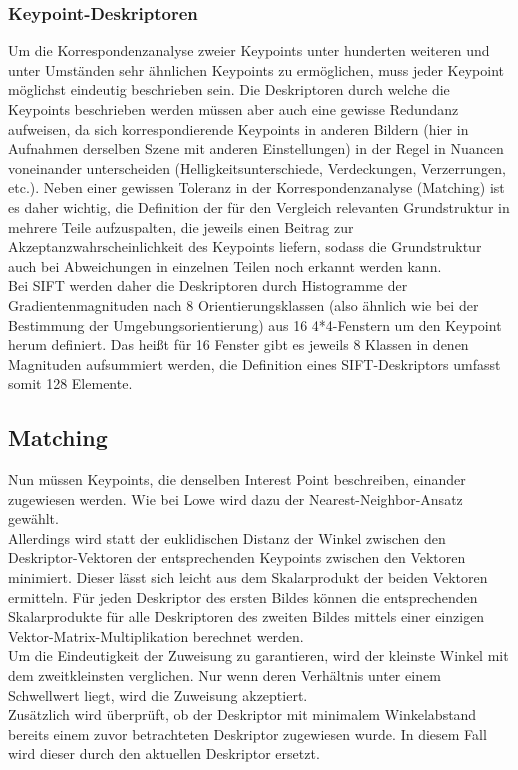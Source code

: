 \documentclass[deutsch]{scrartcl}
\begin{document}
\subsubsection{Keypoint-Deskriptoren}
Um die Korrespondenzanalyse zweier Keypoints unter hunderten weiteren und unter Umständen sehr ähnlichen Keypoints zu ermöglichen, muss jeder Keypoint möglichst eindeutig beschrieben sein. Die Deskriptoren durch welche die Keypoints beschrieben werden müssen aber auch eine gewisse Redundanz aufweisen, da sich korrespondierende Keypoints in anderen Bildern (hier in Aufnahmen derselben Szene mit anderen Einstellungen) in der Regel in Nuancen voneinander unterscheiden (Helligkeitsunterschiede, Verdeckungen, Verzerrungen, etc.). Neben einer gewissen Toleranz in der Korrespondenzanalyse (Matching) ist es daher wichtig, die Definition der für den Vergleich relevanten Grundstruktur in mehrere Teile aufzuspalten, die jeweils einen Beitrag zur Akzeptanzwahrscheinlichkeit des Keypoints liefern, sodass die Grundstruktur auch bei Abweichungen in einzelnen Teilen noch erkannt werden kann.\\
Bei SIFT werden daher die Deskriptoren durch Histogramme der Gradientenmagnituden nach 8 Orientierungsklassen (also ähnlich wie bei der Bestimmung der Umgebungsorientierung) aus 16 4*4-Fenstern um den Keypoint herum definiert. Das heißt für 16 Fenster gibt es jeweils 8 Klassen in denen Magnituden aufsummiert werden, die Definition eines SIFT-Deskriptors umfasst somit 128 Elemente.\cite{lowe04}

\subsection{Matching} 
Nun müssen Keypoints, die denselben Interest Point beschreiben, einander zugewiesen werden. Wie bei Lowe\cite{lowe04} wird dazu der Nearest-Neighbor-Ansatz gewählt.\\
Allerdings wird statt der euklidischen Distanz der Winkel zwischen den Deskriptor-Vektoren der entsprechenden Keypoints zwischen den Vektoren minimiert. Dieser lässt sich leicht aus dem Skalarprodukt der beiden Vektoren ermitteln. Für jeden Deskriptor des ersten Bildes können die entsprechenden Skalarprodukte für alle Deskriptoren des zweiten Bildes mittels einer einzigen Vektor-Matrix-Multiplikation berechnet werden.\\
Um die Eindeutigkeit der Zuweisung zu garantieren, wird der kleinste Winkel mit dem zweitkleinsten verglichen\cite{lowe04}. Nur wenn deren Verhältnis unter einem Schwellwert liegt, wird die Zuweisung akzeptiert.\\
Zusätzlich wird überprüft, ob der Deskriptor mit minimalem Winkelabstand bereits einem zuvor betrachteten Deskriptor zugewiesen wurde. In diesem Fall wird dieser durch den aktuellen Deskriptor ersetzt.\\
\end{document}
